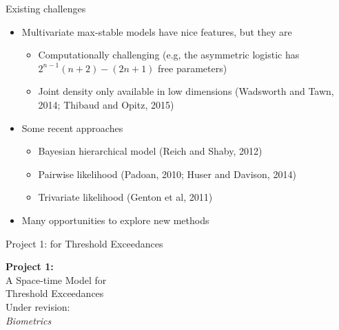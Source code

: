 \documentclass{beamer}
\begin{document}
\begin{frame}{Existing challenges}
	\begin{itemize} \setlength{\itemsep}{1em}
		\item Multivariate max-stable models have nice features, but they are
		\begin{itemize} \setlength{\itemsep}{0.5em}
			\item Computationally challenging (e.g,  the asymmetric logistic has $2^{n-1}(n + 2) - (2n + 1)$ free parameters)
			\item Joint density only available in low dimensions (Wadsworth and Tawn, 2014; Thibaud and Opitz, 2015)
		\end{itemize}
		\item Some recent approaches
		\begin{itemize} \setlength{\itemsep}{0.5em}
			\item Bayesian hierarchical model (Reich and Shaby, 2012)
			\item Pairwise likelihood (Padoan, 2010; Huser and Davison, 2014)
			\item Trivariate likelihood (Genton et al, 2011)
		\end{itemize}
		\item Many opportunities to explore new methods
	\end{itemize}
\end{frame}

\begin{frame}{Project 1: \Skewt{} for Threshold Exceedances}
	\begin{center}
		\LARGE
		\textbf{Project 1:}\\ [1em]
		A Space-time \Skewt{} Model for \\
		Threshold Exceedances\\ [2em]
		\normalsize
		Under revision: \\
		\emph{Biometrics}
	\end{center}
\end{frame}
\end{document}

